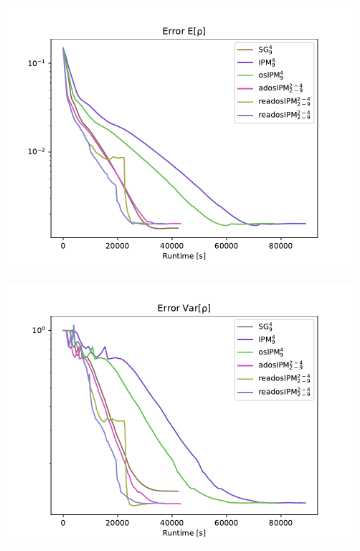\begin{figure}[h!]
\centering
	\begin{subfigure}{0.5\linewidth}
		\centering
				\includegraphics[scale=0.55]{figs/errorEuler/L2_error_E[rho].pdf}
		\caption{}
		\label{fig:sub31}
	\end{subfigure}%
	\begin{subfigure}{0.5\linewidth}
		\centering
				\includegraphics[scale=0.55]{figs/errorEuler/L2_error_Var[rho].pdf}
		\caption{}
		\label{fig:sub32}
	\end{subfigure}
	

\end{figure}
